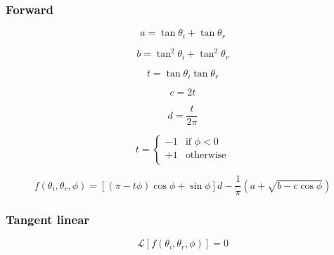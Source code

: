 \subsubsection{Forward}
\label{sec:brdf_kernels-roujean-forward}

\begin{equation}
a = \tan \theta_{i} + \tan \theta_{r}
\label{eq:brdf_kernels-roujean-forward-a}
\end{equation}

\begin{equation}
b = \tan^{2} \theta_{i} + \tan^{2} \theta_{r}
\label{eq:brdf_kernels-roujean-forward-b}
\end{equation}

\begin{equation}
t = \tan \theta_{i} \tan \theta_{r}
\label{eq:brdf_kernels-roujean-forward-t}
\end{equation}

\begin{equation}
c = 2 t
\label{eq:brdf_kernels-roujean-forward-c}
\end{equation}

\begin{equation}
d = \frac{t}{2 \pi}
\label{eq:brdf_kernels-roujean-forward-d}
\end{equation}

\begin{equation}
t = \left\{
\begin{array}{cc}
-1 & \mbox{if $\phi < 0$} \\
+1 & \mbox{otherwise} \\
\end{array}
\right.
\label{eq:brdf_kernels-roujean-forward-t2}
\end{equation}

\begin{equation}
f(\theta_{i}, \theta_{r}, \phi) = \left[(\pi - t\phi) \cos\phi + \sin\phi\right] d - \frac{1}{\pi} (a + \sqrt{b - c \cos\phi})
\label{eq:brdf_kernels-roujean-forward-f}
\end{equation}


\subsubsection{Tangent linear}
\label{sec:brdf_kernels-roujean-tangent_linear}

\begin{equation}
\mathcal{L}\left[f(\theta_{i}, \theta_{r}, \phi)\right] = 0
\label{eq:brdf_kernels-roujean-tangent_linear-f}
\end{equation}


